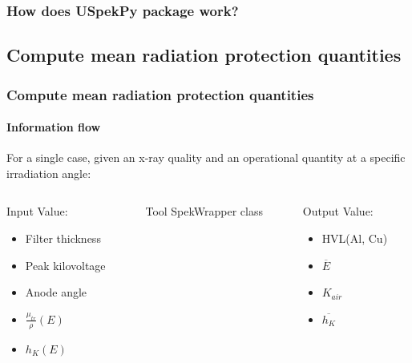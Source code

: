 \documentclass{beamer}
\newcommand{\highlight}[1]{{\color{blue} #1}}
\begin{document}
	\begin{frame}
		\frametitle{How does USpekPy package work?}
		\tableofcontents[
		currentsection,
		sectionstyle=show/shaded,
		subsectionstyle=show/show/hide
		]
	\end{frame}
	
	\subsection{Compute mean radiation protection quantities}
	
	\begin{frame}
		\frametitle{Compute mean radiation protection quantities}
		\framesubtitle{Information flow}
		For a \highlight{single case}, given an x-ray quality and an operational quantity at a specific irradiation angle:
		\begin{columns}[t]
			\begin{column}{0.3\textwidth}
				\begin{block}{Input}
					Value:
					\begin{itemize}
						\item Filter thickness
						\item Peak kilovoltage
						\item Anode angle
						\item $\frac{\mu_{tr}}{\rho}(E)$
						\item $h_K(E)$
					\end{itemize}
				\end{block}
			\end{column}
			\begin{column}{0.3\textwidth}
				\begin{block}{Tool}
					SpekWrapper class
				\end{block}
			\end{column}
			\begin{column}{0.3\textwidth}
				\begin{block}{Output}
					Value:
					\begin{itemize}
						\item HVL(Al, Cu)
						\item $\overline{E}$
						\item $K_{air}$
						\item $\overline{h_K}$
					\end{itemize}
				\end{block}
			\end{column}
		\end{columns}
	\end{frame}
	
\end{document}
